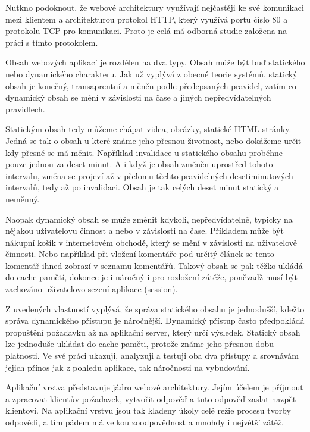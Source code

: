 \documentclass[12pt]{article}
\begin{document}
\obrazek
{}

Nutkno podoknout, že webové architektury využívají nejčastěji ke své komunikaci mezi klientem a architekturou protokol HTTP, který využívá portu číslo 80 a protokolu TCP pro komunikaci. Proto je celá má odborná studie založena na práci s tímto protokolem.

Obsah webových aplikací je rozdělen na dva typy. Obsah může být buď statického nebo dynamického charakteru. Jak už vyplývá z obecné teorie systémů, statický obsah je konečný, transaprentní a měněn podle předepsaných pravidel, zatím co dynamický obsah se mění v závislosti na čase a jiných nepředvídatelných pravidlech. 

Statickým obsah tedy můžeme chápat videa, obrázky, statické HTML stránky. Jedná se tak o obsah u které známe jeho přesnou životnost, nebo dokážeme určit kdy přesně se má měnit. Například invalidace u statického obsahu proběhne pouze jednou za deset minut. A i když je obsah změněn uprostřed tohoto intervalu, změna se projeví až v přelomu těchto pravidelných desetiminutových intervalů, tedy až po invalidaci. Obsah je tak celých deset minut statický a neměnný.

Naopak dynamický obsah se může změnit kdykoli, nepředvídatelně, typicky na nějakou uživatelovu činnost a nebo v závislosti na čase. Příkladem může být nákupní košík v internetovém obchodě, který se mění v závislosti na uživatelově činnosti. Nebo například při vložení komentáře pod určitý článek se tento komentář ihned zobrazí v seznamu komentářů. Takový obsah se pak těžko ukládá do cache pamětí, dokonce je i náročný i pro rozložení zátěže, poněvadž musí být zachováno uživatelovo sezení aplikace (session).

Z uvedených vlastností vyplývá, že správa statického obsahu je jednodušší, kdežto správa dynamického přístupu je náročnější. Dynamický přístup často předpokládá propuštění požadavku až na aplikační server, který určí výsledek. Statický obsah lze jednoduše ukládat do cache paměti, protože známe jeho přesnou dobu platnosti. Ve své práci ukazuji, analyzuji a testuji oba dva přístupy a srovnávám jejich přínos jak z pohledu aplikace, tak náročnosti na vybudování.

Aplikační vrstva představuje jádro webové architektury. Jejím účelem je příjmout a zpracovat klientův požadavek, vytvořit odpověď a tuto odpověď zaslat nazpět klientovi. Na aplikační vrstvu jsou tak kladeny úkoly celé režie procesu tvorby odpovědi, a tím pádem má velkou zoodpovědnost a mnohdy i největší zátěž.
\end{document}
